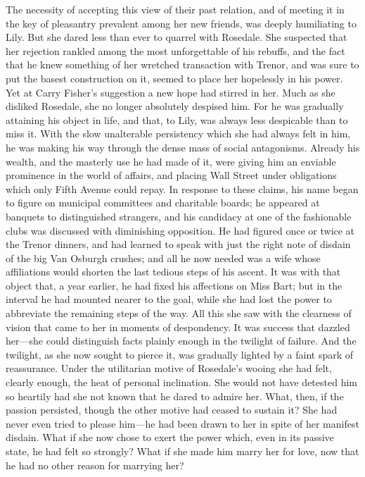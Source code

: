 \documentclass[12pt,a4paper]{book}
\begin{document}
The necessity of accepting this view of their past relation, and
of meeting it in the key of pleasantry prevalent among her new
friends, was deeply humiliating to Lily. But she dared less than
ever to quarrel with Rosedale. She suspected that her rejection
rankled among the most unforgettable of his rebuffs, and the fact
that he knew something of her wretched transaction with Trenor,
and was sure to put the basest construction on it, seemed to
place her hopelessly in his power. Yet at Carry Fisher's
suggestion a new hope had stirred in her. Much as she disliked
Rosedale, she no longer absolutely despised him. For he was
gradually attaining his object in life, and that, to Lily, was
always less despicable than to miss it. With the slow unalterable
persistency which she had always felt in him, he was making his
way through the dense mass of social antagonisms. Already his
wealth, and the masterly use he had made of it, were giving him
an enviable prominence in the world of affairs, and placing Wall
Street under obligations which only Fifth Avenue could repay. In
response to these claims, his name began to figure on municipal
committees and charitable boards; he appeared at banquets to
distinguished strangers, and his candidacy at one of the
fashionable clubs was discussed with diminishing opposition. He
had figured once or twice at the Trenor dinners, and had learned
to speak with just the right note of disdain of the big Van
Osburgh crushes; and all he now needed was a wife whose
affiliations would shorten the last tedious steps of his ascent. 
It was with that object that, a year earlier, he had fixed
his affections on Miss Bart; but in the interval he had
mounted nearer to the goal, while she had lost the power to
abbreviate the remaining steps of the way. All this she saw with
the clearness of vision that came to her in moments of
despondency. It was success that dazzled her---she could
distinguish facts plainly enough in the twilight of failure. And
the twilight, as she now sought to pierce it, was gradually
lighted by a faint spark of reassurance. Under the utilitarian
motive of Rosedale's wooing she had felt, clearly enough, the
heat of personal inclination. She would not have detested him so
heartily had she not known that he dared to admire her. What,
then, if the passion persisted, though the other motive had
ceased to sustain it? She had never even tried to please him---he
had been drawn to her in spite of her manifest disdain. What if
she now chose to exert the power which, even in its passive
state, he had felt so strongly? What if she made him marry her
for love, now that he had no other reason for marrying her?
\end{document}

